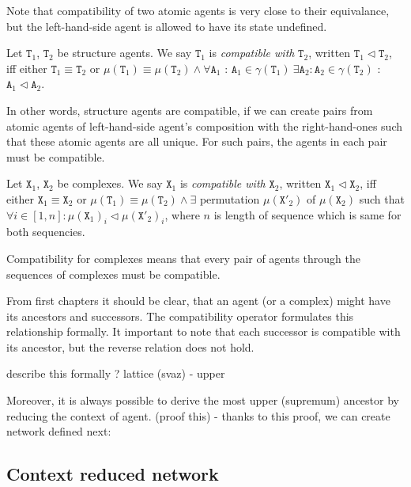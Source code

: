 \documentclass[12pt]{fithesis2}
\begin{document}
Note that compatibility of two atomic agents is very close to their equivalance, but the left-hand-side agent is allowed to have its state undefined. 

\begin{definition}
Let $\mathtt{T}_1$, $\mathtt{T}_2$ be structure agents. We say $\mathtt{T}_1$ is \emph{compatible with} $\mathtt{T}_2$, written $\mathtt{T}_1 \lhd \mathtt{T}_2$, iff either $\mathtt{T}_1 \equiv \mathtt{T}_2$ or $\mu(\mathtt{T}_1) \equiv \mu(\mathtt{T}_2) \wedge \forall \mathtt{A}_1$ : $\mathtt{A}_1 \in \gamma(\mathtt{T}_1) ~\exists \mathtt{A}_2 : \mathtt{A}_2 \in \gamma(\mathtt{T}_2)$ : $\mathtt{A}_1 \lhd \mathtt{A}_2$.
\end{definition}

In other words, structure agents are compatible, if we can create pairs from atomic agents of left-hand-side agent's composition with the right-hand-ones such that these atomic agents are all unique. For such pairs, the agents in each pair must be compatible.

\begin{definition}
Let $\mathtt{X}_1$, $\mathtt{X}_2$ be complexes. We say $\mathtt{X}_1$ is \emph{compatible with} $\mathtt{X}_2$, written $\mathtt{X}_1 \lhd \mathtt{X}_2$, iff either $\mathtt{X}_1 \equiv \mathtt{X}_2$ or $\mu(\mathtt{T}_1) \equiv \mu(\mathtt{T}_2) \wedge \exists$ permutation $ \mu(\mathtt{X}'_2)$ of $\mu(\mathtt{X}_2)$ such that $ \forall i \in [1, n] : \mu(\mathtt{X}_1)_i \lhd \mu(\mathtt{X}'_2)_i $, where $n$ is length of sequence which is same for both sequencies.
\end{definition}

Compatibility for complexes means that every pair of agents through the sequences of complexes must be compatible.

From first chapters it should be clear, that an agent (or a complex) might have its ancestors and successors. The compatibility operator formulates this relationship formally. It important to note that each successor is compatible with its ancestor, but the reverse relation does not hold. 

describe this formally ? lattice (svaz) - upper

Moreover, it is always possible to derive the most upper (supremum) ancestor by reducing the context of agent. (proof this) - thanks to this proof, we can create network defined next:

\subsection{Context reduced network}
\end{document}
